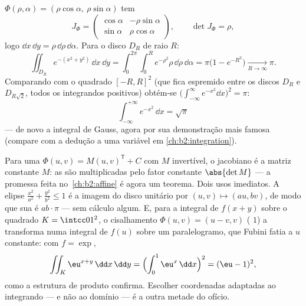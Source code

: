 \begin{example}\label{ex:b2:multint:polar}
$\Phi(\rho, \alpha) = (\rho\cos\alpha,\ \rho\sin\alpha)$ tem
\[
J_\Phi = \begin{pmatrix}
\cos\alpha & -\rho\sin\alpha\\
\sin\alpha & \rho\cos\alpha
\end{pmatrix},
\qquad \det J_\Phi = \rho ,
\]
logo $\dd x\,\dd y = \rho\,\dd\rho\,\dd\alpha$. Para o disco $D_R$
de raio $R$:
\[
\iint_{D_R} e^{-(x^2 + y^2)}\,\dd x\,\dd y
= \int_0^{2\pi}\!\!\int_0^R e^{-\rho^2}\rho\,\dd\rho\,\dd\alpha
= \pi\bigl(1 - e^{-R^2}\bigr)
\xrightarrow[R\to\infty]{} \pi .
\]
Comparando com o quadrado $[-R, R]^2$ (que fica espremido entre
os discos $D_R$ e $D_{R\sqrt2}$, todos os integrandos positivos) obtém-se
$\bigl(\int_{-\infty}^\infty e^{-x^2}\dd x\bigr)^2 = \pi$:
\[
\boxed{\ \int_{-\infty}^{+\infty} e^{-x^2}\,\dd x = \sqrt{\pi}\ }
\]
--- de novo a integral de Gauss, agora por sua demonstração mais famosa
(compare com a dedução a uma variável em
\cref{ch:b2:integration}).
\end{example}

\begin{example}\label{ex:b2:multint:affine}
Para uma  $\Phi(u, v) = M(u, v)^{\mathsf T} + C$ com
$M$ invertível, o jacobiano é a matriz constante $M$:
as  são multiplicadas pelo fator constante $\abs{\det M}$
--- a promessa feita no~\cref{ch:b2:affine} é agora um teorema.
Dois usos imediatos. A elipse $\frac{x^2}{a^2} +
\frac{y^2}{b^2} \leq 1$ é a imagem do disco unitário por
$(u, v) \mapsto (au, bv)$, de modo que sua  é $ab \cdot \pi$ ---
sem cálculo algum. E, para a integral de $f(x + y)$ sobre o
quadrado $K = \intcc01^2$, o cisalhamento $\Phi(u, v) = (u - v, v)$
( $1$) a transforma numa integral de $f(u)$ sobre um
paralelogramo, que Fubini fatia a $u$ constante: com $f =
\exp$,
\[
\iint_K \eu^{x+y}\,\dd x\,\dd y
= \Bigl(\int_0^1 \eu^x\,\dd x\Bigr)^2 = (\eu - 1)^2,
\]
como a estrutura de produto confirma. Escolher coordenadas
adaptadas ao integrando --- e não ao domínio --- é a
outra metade do ofício.
\end{example}


